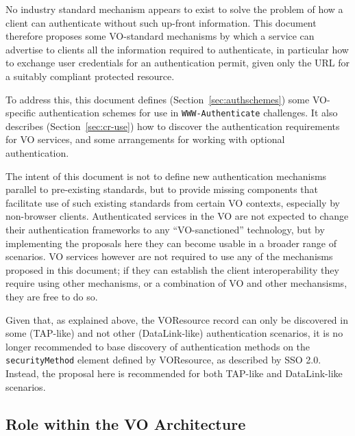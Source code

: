 \documentclass[11pt,a4paper]{ivoa}
\newcommand{\header}[1]{{\tt #1}}
\begin{document}
No industry standard mechanism appears to exist to solve the
problem of how a client can authenticate without such up-front
information.
This document therefore proposes some VO-standard mechanisms
by which a service can advertise to clients all the information
required to authenticate,
in particular how to exchange user credentials for an authentication permit,
given only the URL for a suitably compliant protected resource.

To address this, this document defines (Section~\ref{sec:authschemes})
some VO-specific authentication schemes
for use in \header{WWW-Authenticate} challenges.
It also describes (Section~\ref{sec:cr-use}) how to discover the
authentication requirements for VO services, and
some arrangements for working with optional authentication.

The intent of this document is not to define new authentication
mechanisms parallel to pre-existing standards, but to provide
missing components that facilitate use of such existing standards
from certain VO contexts, especially by non-browser clients.
Authenticated services in the VO are not expected to change their
authentication frameworks to any ``VO-sanctioned'' technology,
but by implementing the proposals here they can become usable
in a broader range of scenarios.
VO services however are not required to use any of the  
mechanisms proposed in this document; if they can establish the
client interoperability they require using other mechanisms, or
a combination of VO and other mechansisms, they are free to do so.

Given that, as explained above,
the VOResource record can only be discovered in some (TAP-like)
and not other (DataLink-like) authentication scenarios,
it is no longer recommended to base discovery of authentication methods
on the {\tt securityMethod} element
defined by VOResource, as described by SSO 2.0.
Instead, the proposal here is recommended for both TAP-like and DataLink-like
scenarios.

\subsection{Role within the VO Architecture}
\end{document}
